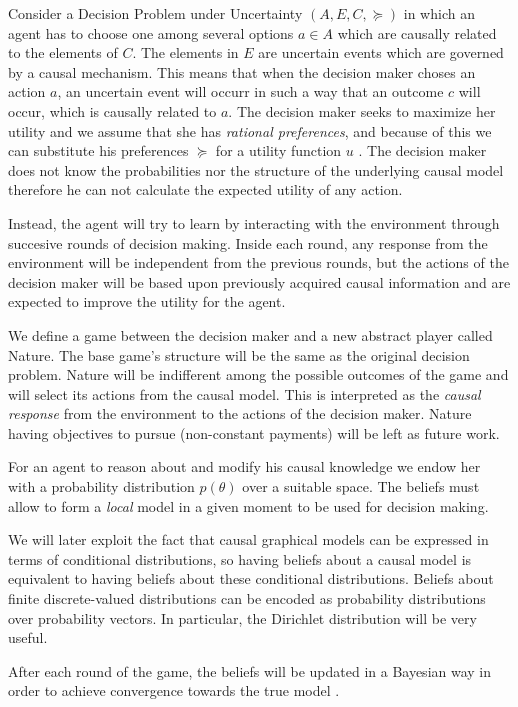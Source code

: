 \documentclass{article}
\begin{document}
Consider a Decision Problem under Uncertainty $(A,E,C,\succeq)$ in which an agent has to choose one among several options $a \in A$ which are causally related to the elements of $C$. The elements in $E$ are uncertain events which are governed by a causal mechanism. This means that when the decision maker choses an action $a$, an uncertain event will occurr in such a way that an outcome $c$ will occur, which is causally related to $a$. The decision maker seeks to maximize her utility and we assume that she has \textit{rational preferences}, and because of this we can substitute his preferences $\succeq$ for a utility function $u$ \cite{gilboa2009decision}. The decision maker does not know the probabilities nor the structure of the underlying causal model therefore he can not calculate the expected utility of any action. 

Instead, the agent will try to learn by interacting with the environment through succesive rounds of decision making. Inside each round, any response from the environment will be independent from the previous rounds, but the actions of the decision maker will be based upon previously acquired causal information and are expected to improve the utility for the agent.

We define a game between the decision maker and a new abstract player called Nature. The base game's structure will be the same as the original decision problem. Nature will be indifferent among the possible outcomes of the game and will select its actions from the causal model. This is interpreted as the \textit{causal response} from the environment to the actions of the decision maker. Nature having objectives to pursue (non-constant payments) will be left as future work.

For an agent to reason about and modify his causal knowledge we endow her with a probability distribution $p(\theta)$ over a suitable space. The beliefs must allow to form a \textit{local} model in a given moment to be used for decision making.

We will later exploit the fact that causal graphical models can be expressed in terms of conditional distributions, so having beliefs about a causal model is equivalent to having beliefs about these conditional distributions. Beliefs about finite discrete-valued distributions can be encoded as probability distributions over probability vectors. In particular, the Dirichlet distribution will be very useful.

After each round of the game, the beliefs will be updated in a Bayesian way in order to achieve convergence towards the true model \cite{shoham2008multiagent}.
\end{document}
